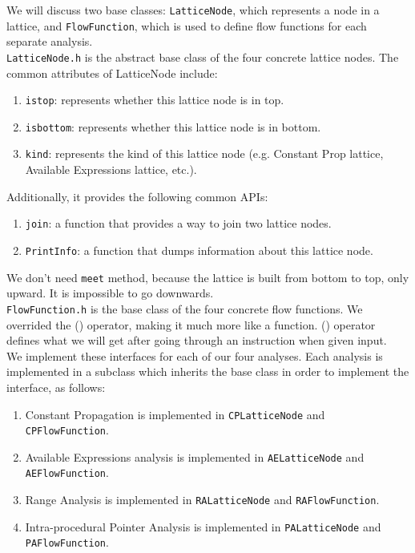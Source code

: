 \documentclass[paper=letter, fontsize=11pt]{scrartcl}
\numberwithin{equation}{section}		%
\numberwithin{figure}{section}			%
\numberwithin{table}{section}				%
\begin{document}
We will discuss two base classes:  \texttt{LatticeNode}, which represents a node in a lattice,  and \texttt{FlowFunction}, which is used to define flow functions for each separate analysis. \\

\texttt{LatticeNode.h} is the abstract base class of the four concrete lattice nodes. The common attributes of LatticeNode include:
\begin{enumerate}
\item \texttt{istop}:  represents whether this lattice node is in top.
\item \texttt{isbottom}: represents whether this lattice node is in bottom.
\item \texttt{kind}: represents the kind of this lattice node (e.g. Constant Prop lattice, Available Expressions lattice, etc.).
\end{enumerate}

Additionally, it provides the following common APIs:
\begin{enumerate}
\item \texttt{join}: a function that provides a way to join two lattice nodes.
\item \texttt{PrintInfo}: a function that dumps information about this lattice node.
\end{enumerate}

We don't need \texttt{meet} method, because the lattice is built from bottom to top, only upward. It is impossible to go downwards. \\

\texttt{FlowFunction.h} is the base class of the four concrete flow functions. We overrided the () operator, making it much more like a function. () operator defines what we will get after going through an instruction when given input. \\

We implement these interfaces for each of our four analyses. Each analysis is implemented in a subclass which inherits the base class in order to implement the interface, as follows:
\begin{enumerate}
\item Constant Propagation is implemented in \texttt{CPLatticeNode} and \texttt{CPFlowFunction}.
\item Available Expressions analysis is implemented in \texttt{AELatticeNode} and \texttt{AEFlowFunction}.
\item Range Analysis is implemented in \texttt{RALatticeNode} and \texttt{RAFlowFunction}.
\item Intra-procedural Pointer Analysis is implemented in \texttt{PALatticeNode} and \texttt{PAFlowFunction}.
\end{enumerate}
\end{document}
